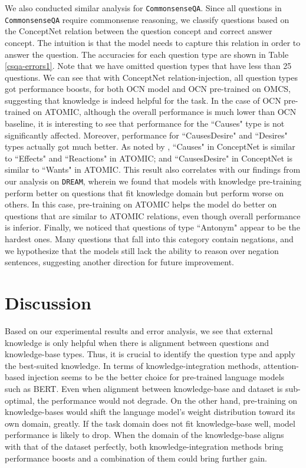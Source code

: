 \documentclass[11pt,a4paper]{article}
\begin{document}
We also conducted similar analysis for \texttt{CommonsenseQA}. Since all questions in \texttt{CommonsenseQA} require commonsense reasoning, we classify questions based on the ConceptNet relation between the question concept and correct answer concept. The intuition is that the model needs to capture this relation in order to answer the question. The accuracies for each question type are shown in Table \ref{csqa-errors1}. Note that we have omitted question types that have less than 25 questions. We can see that with ConceptNet relation-injection, all question types got performance boosts, for both OCN model and OCN pre-trained on OMCS, suggesting that knowledge is indeed helpful for the task. In the case of OCN pre-trained on ATOMIC, although the overall performance is much lower than OCN baseline, it is interesting to see that performance for the ``Causes" type is not significantly affected. Moreover, performance for ``CausesDesire" and ``Desires" types actually got much better. As noted by \cite{sap2019atomic}, ``Causes" in ConceptNet is similar to ``Effects" and ``Reactions" in ATOMIC; and ``CausesDesire" in ConceptNet is similar to ``Wants" in ATOMIC. This result also correlates with our findings from our analysis on \texttt{DREAM}, wherein we found that models with knowledge pre-training perform better on questions that fit knowledge domain but perform worse on others. In this case, pre-training on ATOMIC helps the model do better on questions that are similar to ATOMIC relations, even though overall performance is inferior. Finally, we noticed that questions of type ``Antonym" appear to be the hardest ones. Many questions that fall into this category contain negations, and we hypothesize that the models still lack the ability to reason over negation sentences, suggesting another direction for future improvement. 

\section{Discussion}
Based on our experimental results and error analysis, we see that external knowledge is only helpful when there is alignment between questions and knowledge-base types. Thus, it is crucial to identify the question type and apply the best-suited knowledge. In terms of knowledge-integration methods, attention-based injection seems to be the better choice for pre-trained language models such as BERT. Even when alignment between knowledge-base and dataset is sub-optimal, the performance would not degrade. On the other hand, pre-training on knowledge-bases would shift the language model's weight distribution toward its own domain, greatly. If the task domain does not fit knowledge-base well, model performance is likely to drop. When the domain of the knowledge-base aligns with that of the dataset perfectly, both knowledge-integration methods bring performance boosts and a combination of them could bring further gain.
\end{document}
